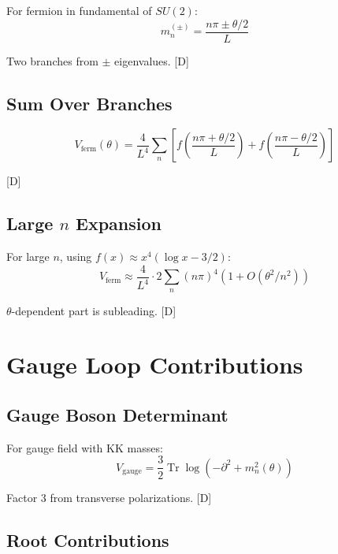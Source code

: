 \documentclass[11pt,a4paper]{article}
\newcommand{\tagD}{\textcolor{blue!70!black}{[D]}}
\DeclareMathOperator{\Tr}{Tr}
\begin{document}
For fermion in fundamental of $SU(2)$:
\begin{equation}
\label{eq:ferm-fund}
m_n^{(\pm)} = \frac{n\pi \pm \theta/2}{L}
\end{equation}

Two branches from $\pm$ eigenvalues. \tagD

\subsection{Sum Over Branches}

\begin{equation}
\label{eq:ferm-branch-sum}
V_{\text{ferm}}(\theta) = \frac{4}{L^4} \sum_n \left[f\left(\frac{n\pi + \theta/2}{L}\right) + f\left(\frac{n\pi - \theta/2}{L}\right)\right]
\end{equation}

\tagD

\subsection{Large $n$ Expansion}

For large $n$, using $f(x) \approx x^4(\log x - 3/2)$:
\begin{equation}
\label{eq:ferm-large-n}
V_{\text{ferm}} \approx \frac{4}{L^4} \cdot 2 \sum_n (n\pi)^4 \left(1 + O(\theta^2/n^2)\right)
\end{equation}

$\theta$-dependent part is subleading. \tagD

\section{Gauge Loop Contributions}

\subsection{Gauge Boson Determinant}

For gauge field with KK masses:
\begin{equation}
\label{eq:gauge-det}
V_{\text{gauge}} = \frac{3}{2}\Tr\log(-\partial^2 + m_n^2(\theta))
\end{equation}

Factor 3 from transverse polarizations. \tagD

\subsection{Root Contributions}
\end{document}
